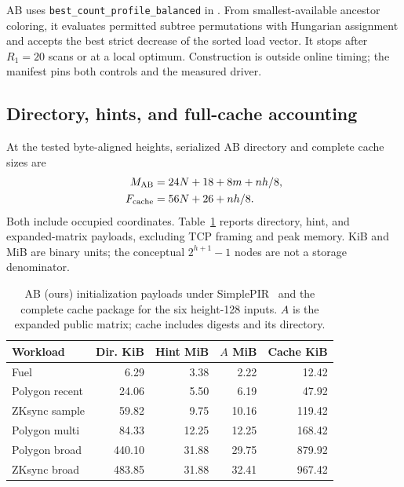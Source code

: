 AB uses \texttt{best\_count\_profile\_balanced} in . From smallest-available ancestor coloring, it evaluates permitted subtree permutations with Hungarian assignment and accepts the best strict decrease of the sorted load vector. It stops after $R_1=20$ scans or at a local optimum. Construction is outside online timing; the manifest pins both controls and the measured driver.

\subsection{Directory, hints, and full-cache accounting}
\label{sec:setup-costs}

At the tested byte-aligned heights, serialized AB directory and complete cache sizes are
\begin{align}
M_{\rm AB}&=24N+18+8m+nh/8,\label{eq:measured-directory}\\
F_{\rm cache}&=56N+26+nh/8.\label{eq:measured-cache}
\end{align}
Both include occupied coordinates. Table~\ref{tab:setup-costs} reports directory, hint, and expanded-matrix payloads, excluding TCP framing and peak memory. KiB and MiB are binary units; the conceptual $2^{h+1}-1$ nodes are not a storage denominator.

\begin{table}[t]
\centering\small\setlength{\tabcolsep}{3pt}
\caption{AB (ours) initialization payloads under SimplePIR~\cite{simplepir} and the complete cache package for the six height-128 inputs. $A$ is the expanded public matrix; cache includes digests and its directory.}
\label{tab:setup-costs}
\begin{tabular}{@{}lrrrr@{}}
\toprule
Workload & Dir. KiB & Hint MiB & $A$ MiB & Cache KiB\\
\midrule
Fuel & 6.29 & 3.38 & 2.22 & 12.42\\
Polygon recent & 24.06 & 5.50 & 6.19 & 47.92\\
ZKsync sample & 59.82 & 9.75 & 10.16 & 119.42\\
Polygon multi & 84.33 & 12.25 & 12.25 & 168.42\\
Polygon broad & 440.10 & 31.88 & 29.75 & 879.92\\
ZKsync broad & 483.85 & 31.88 & 32.41 & 967.42\\
\bottomrule
\end{tabular}
\end{table}

